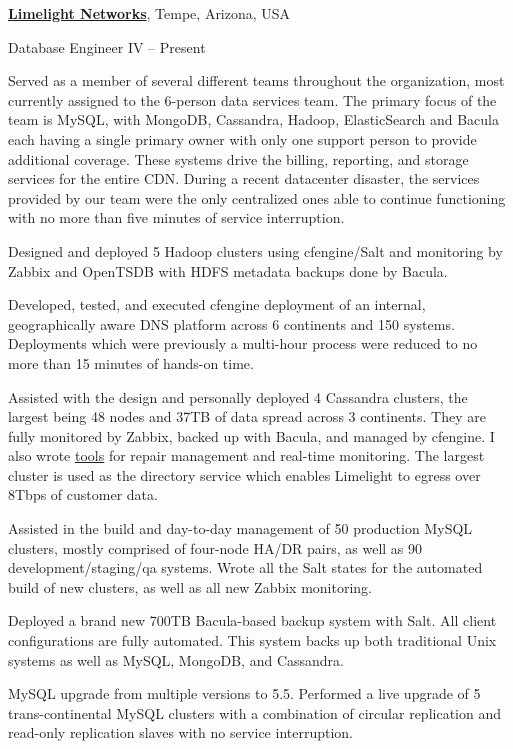\documentclass[letterpaper,10pt,oneside]{article}
\begin{document}
\begin{body}
\href{http://www.limelight.com/}
{\textbf{Limelight Networks}},
Tempe, Arizona, USA
\par
Database Engineer IV
\hfill
{} -- Present

\begin{detail}

Served as a member of several different teams throughout the organization,
most currently assigned to the 6-person data services team.  The primary
focus of the team is MySQL, with MongoDB, Cassandra, Hadoop, ElasticSearch
and Bacula each having a single primary owner with only one support person
to provide additional coverage.  These systems drive the billing,
reporting, and storage services for the entire CDN.  During a recent
datacenter disaster, the services provided by our team were the only
centralized ones able to continue functioning with no more than five
minutes of service interruption.

\BulletItem Designed and deployed 5 Hadoop clusters using cfengine/Salt and
monitoring by Zabbix and OpenTSDB with HDFS metadata backups done by
Bacula.

\BulletItem Developed, tested, and executed cfengine deployment of an
internal, geographically aware DNS platform across 6 continents and 150
systems.  Deployments which were previously a multi-hour process were
reduced to no more than 15 minutes of hands-on time.

\BulletItem Assisted with the design and personally deployed 4 Cassandra
clusters, the largest being 48 nodes and 37TB of data spread across 3
continents.  They are fully monitored by Zabbix, backed up with Bacula, and
managed by cfengine.  I also wrote
\href{https://github.com/BrianGallew/cassandra\_tools}{tools} for repair
management and real-time monitoring.  The largest cluster is used as the
directory service which enables Limelight to egress over 8Tbps of customer
data.

\BulletItem Assisted in the build and day-to-day management of 50
production MySQL clusters, mostly comprised of four-node HA/DR pairs, as
well as 90 development/staging/qa systems.  Wrote all the Salt states for
the automated build of new clusters, as well as all new Zabbix monitoring.

\BulletItem Deployed a brand new 700TB Bacula-based backup system with
Salt.  All client configurations are fully automated.  This system backs up
both traditional Unix systems as well as MySQL, MongoDB, and Cassandra.

\BulletItem MySQL upgrade from multiple versions to 5.5.  Performed a live
upgrade of 5 trans-continental MySQL clusters with a combination of
circular replication and read-only replication slaves with no service
interruption.


\end{detail}
\end{body}
\end{document}
